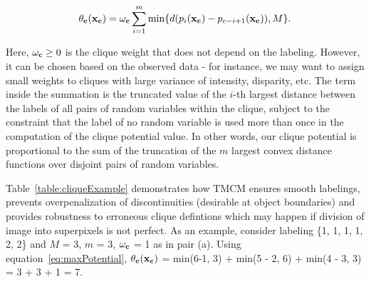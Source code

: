 \documentclass[runningheads]{llncs}
\begin{document}
\begin{equation}
\small \theta_{\bf c}({\bf x}_{\bf c}) = \omega_{\bf c} \sum_{i=1}^m \min\{d(p_i({\bf x}_{\bf c})-p_{c-i+1}({\bf x}_{\bf c})),M\}.
\label{eq:maxPotential}
\end{equation}

Here, $\omega_{\bf c} \geq 0$ is the clique weight that does not depend on the labeling. However, it can be chosen based on the observed data - for instance, we may want to assign small weights to cliques with large variance of intensity, disparity, etc. The term inside the summation is the truncated
value of the $i$-th largest distance between the labels of all pairs of random variables within the clique, subject to the constraint that the label of no random
variable is used more than once in the computation of the clique potential value. In other words, our clique potential is proportional to the
sum of the truncation of the $m$ largest convex distance functions over disjoint pairs of random variables. 


Table~\ref{table:cliqueExample} demonstrates how TMCM ensures smooth labelings, prevents overpenalization of discontinuities (desirable at object boundaries) and provides robustness to erroneous clique defintions which may happen if division of image into superpixels is not perfect. As an example, consider labeling \{1, 1, 1, 1, 2, 2\} and $M$ = 3, $m$ = 3, $\bf\omega_c$ = 1 as in pair (a). Using equation~\ref{eq:maxPotential}, $\theta_{\bf c}({\bf x}_{\bf c})$ = min(6-1, 3) + min(5 - 2, 6) + min(4 - 3, 3) = 3 + 3 + 1 = 7.
\vspace{-2mm}
\end{document}
